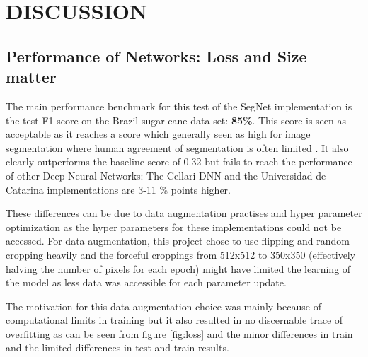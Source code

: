 \documentclass{article}
\begin{document}





%



\section{DISCUSSION}

\subsection{Performance of Networks: Loss and Size matter}
The main performance benchmark for this test of the SegNet implementation is the test F1-score on the Brazil sugar cane data set: \textbf{85\%}.
This score is seen as acceptable as it reaches a score which generally seen as high for image segmentation where human agreement of segmentation is often limited \cite{eval}.  It also clearly outperforms the baseline score of 0.32 but fails to reach the performance of other Deep Neural Networks: The Cellari DNN and the Universidad de Catarina implementations are 3-11 \% points higher. 

These differences can be due to data augmentation practises and hyper parameter optimization as the hyper parameters for these implementations could not be accessed.
For data augmentation, this project chose to use flipping and random cropping heavily and the forceful croppings from 512x512 to 350x350 (effectively halving the number of pixels for each epoch) might have limited the learning of the model as less data was accessible for each parameter update. 

The motivation for this data augmentation choice was mainly because of computational limits in training but it also resulted in no discernable trace of overfitting as can be seen from figure \ref{fig:loss} and the minor differences in train and the limited differences in test and train results.
\end{document}
